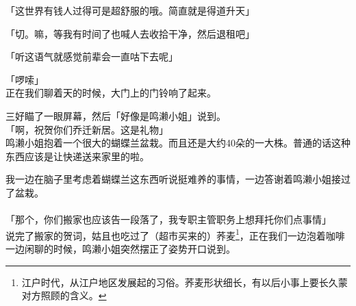 「这世界有钱人过得可是超舒服的哦。简直就是得道升天」

「切。嘛，等我有时间了也喊人去收拾干净，然后退租吧」

「听这语气就感觉前辈会一直咕下去呢」

「啰嗦」\\

正在我们聊着天的时候，大门上的门铃响了起来。

三好瞄了一眼屏幕，然后「好像是鸣濑小姐」说到。\\

「啊，祝贺你们乔迁新居。这是礼物」\\

鸣濑小姐抱着一个很大的蝴蝶兰盆栽。而且还是大约40朵的一大株。普通的话这种东西应该是让快递送来家里的啦。

我一边在脑子里考虑着蝴蝶兰这东西听说挺难养的事情，一边答谢着鸣濑小姐接过了盆栽。\\

\sqsplit\\

「那个，你们搬家也应该告一段落了，我专职主管职务上想拜托你们点事情」\\

说完了搬家的贺词，姑且也吃过了（超市买来的）荞麦\footnote{江户时代，从江户地区发展起的习俗。荞麦形状细长，有以后小事上要长久蒙对方照顾的含义。}，正在我们一边泡着咖啡一边闲聊的时候，鸣濑小姐突然摆正了姿势开口说到。\\


